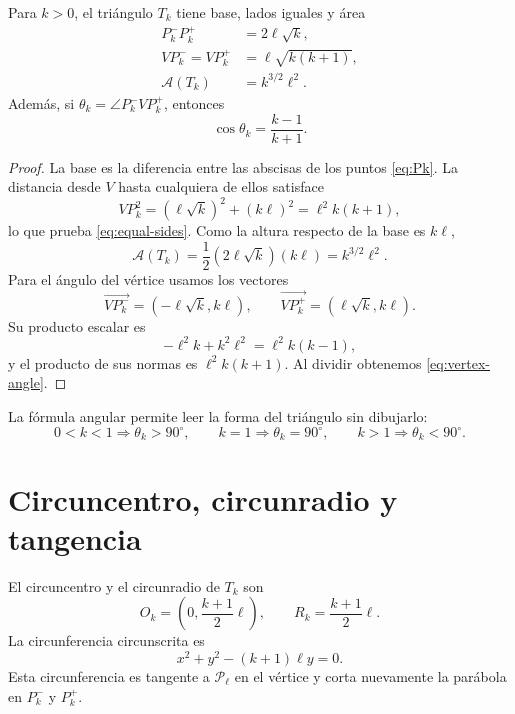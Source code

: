 \documentclass[11pt,a4paper,openany]{report}
\newcommand{\Area}{\mathcal{A}}
\begin{document}
\begin{proposition}
Para \(k>0\), el triángulo \(T_k\) tiene base, lados iguales y área
\begin{align}
 P_k^-P_k^+&=2\ell\sqrt{k},\label{eq:base}\\
 VP_k^-=VP_k^+&=\ell\sqrt{k(k+1)},\label{eq:equal-sides}\\
 \Area(T_k)&=k^{3/2}\ell^2.\label{eq:areaTk}
\end{align}
Además, si \(\theta_k=\angle P_k^-VP_k^+\), entonces
\begin{equation}
 \boxed{\cos\theta_k=\frac{k-1}{k+1}}.
 \label{eq:vertex-angle}
\end{equation}
\end{proposition}

\begin{proof}
La base es la diferencia entre las abscisas de los puntos \eqref{eq:Pk}. La distancia desde \(V\) hasta cualquiera de ellos satisface
\[
 VP_k^2=(\ell\sqrt{k})^2+(k\ell)^2
       =\ell^2k(k+1),
\]
lo que prueba \eqref{eq:equal-sides}. Como la altura respecto de la base es \(k\ell\),
\[
 \Area(T_k)=\frac12(2\ell\sqrt{k})(k\ell)=k^{3/2}\ell^2.
\]
Para el ángulo del vértice usamos los vectores
\[
 \overrightarrow{VP_k^-}=(-\ell\sqrt{k},k\ell),
 \qquad
 \overrightarrow{VP_k^+}=(\ell\sqrt{k},k\ell).
\]
Su producto escalar es
\[
 -\ell^2k+k^2\ell^2=\ell^2k(k-1),
\]
y el producto de sus normas es \(\ell^2k(k+1)\). Al dividir obtenemos \eqref{eq:vertex-angle}.
\end{proof}

La fórmula angular permite leer la forma del triángulo sin dibujarlo:
\[
 0<k<1\Rightarrow \theta_k>90^\circ,
 \qquad
 k=1\Rightarrow \theta_k=90^\circ,
 \qquad
 k>1\Rightarrow \theta_k<90^\circ.
\]

\section{Circuncentro, circunradio y tangencia}

\begin{theorem}
El circuncentro y el circunradio de \(T_k\) son
\begin{equation}
 \boxed{
 O_k=\left(0,\frac{k+1}{2}\ell\right),
 \qquad
 R_k=\frac{k+1}{2}\ell.}
 \label{eq:circumcenter}
\end{equation}
La circunferencia circunscrita es
\begin{equation}
 \boxed{x^2+y^2-(k+1)\ell y=0.}
 \label{eq:circle-k}
\end{equation}
Esta circunferencia es tangente a \(\mathcal P_\ell\) en el vértice y corta nuevamente la parábola en \(P_k^-\) y \(P_k^+\).
\end{theorem}
\end{document}
